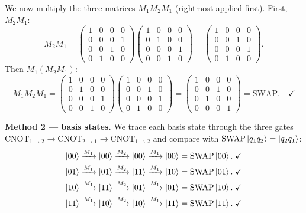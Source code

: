 \documentclass{ceri/sty/rapport}
\begin{document}
\begin{solution}
We now multiply the three matrices $M_1 M_2 M_1$ (rightmost applied first).
First, $M_2 M_1$:
\[
  M_2 M_1
  =\begin{pmatrix}1&0&0&0\\0&0&0&1\\0&0&1&0\\0&1&0&0\end{pmatrix}
   \begin{pmatrix}1&0&0&0\\0&1&0&0\\0&0&0&1\\0&0&1&0\end{pmatrix}
  =\begin{pmatrix}1&0&0&0\\0&0&1&0\\0&0&0&1\\0&1&0&0\end{pmatrix}.
\]
Then $M_1(M_2 M_1)$:
\[
  M_1 M_2 M_1
  =\begin{pmatrix}1&0&0&0\\0&1&0&0\\0&0&0&1\\0&0&1&0\end{pmatrix}
   \begin{pmatrix}1&0&0&0\\0&0&1&0\\0&0&0&1\\0&1&0&0\end{pmatrix}
  =\begin{pmatrix}1&0&0&0\\0&0&1&0\\0&1&0&0\\0&0&0&1\end{pmatrix}
  =\mathrm{SWAP}.\quad\checkmark
\]

\medskip\noindent
\textbf{Method 2 — basis states.}
We trace each basis state through the three gates
$\mathrm{CNOT}_{1\to2}\to\mathrm{CNOT}_{2\to1}\to\mathrm{CNOT}_{1\to2}$
and compare with $\mathrm{SWAP}\ket{q_1 q_2}=\ket{q_2 q_1}$:
\begin{align*}
\ket{00}&\xrightarrow{M_1}\ket{00}\xrightarrow{M_2}\ket{00}\xrightarrow{M_1}\ket{00}
         =\mathrm{SWAP}\ket{00}.\;\checkmark\\
\ket{01}&\xrightarrow{M_1}\ket{01}\xrightarrow{M_2}\ket{11}\xrightarrow{M_1}\ket{10}
         =\mathrm{SWAP}\ket{01}.\;\checkmark\\
\ket{10}&\xrightarrow{M_1}\ket{11}\xrightarrow{M_2}\ket{01}\xrightarrow{M_1}\ket{01}
         =\mathrm{SWAP}\ket{10}.\;\checkmark\\
\ket{11}&\xrightarrow{M_1}\ket{10}\xrightarrow{M_2}\ket{10}\xrightarrow{M_1}\ket{11}
         =\mathrm{SWAP}\ket{11}.\;\checkmark
\end{align*}
\end{solution}
\end{document}
